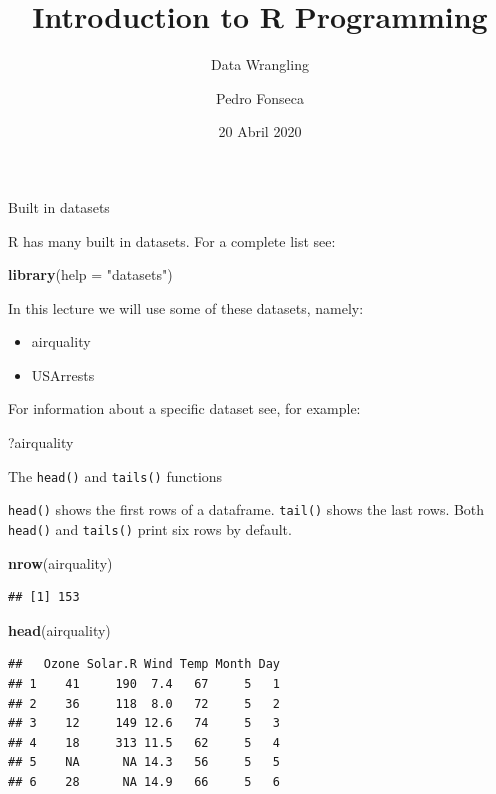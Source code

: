 \documentclass[ignorenonframetext,]{beamer}
\title{Introduction to R Programming}
\subtitle{Data Wrangling}
\author{Pedro Fonseca}
\date{20 Abril 2020}
\newenvironment{Shaded}{\begin{snugshade}}{\end{snugshade}}
\newcommand{\DataTypeTok}[1]{\textcolor[rgb]{0.13,0.29,0.53}{#1}}
\newcommand{\KeywordTok}[1]{\textcolor[rgb]{0.13,0.29,0.53}{\textbf{#1}}}
\newcommand{\NormalTok}[1]{#1}
\newcommand{\StringTok}[1]{\textcolor[rgb]{0.31,0.60,0.02}{#1}}
\providecommand{\tightlist}{%
  \setlength{\itemsep}{0pt}\setlength{\parskip}{0pt}}
\begin{document}
\frame{\titlepage}

\begin{frame}[fragile]{Built in datasets}
\protect\hypertarget{built-in-datasets}{}

R has many built in datasets. For a complete list see:

\begin{Shaded}
\begin{Highlighting}[]
\KeywordTok{library}\NormalTok{(}\DataTypeTok{help =} \StringTok{"datasets"}\NormalTok{)}
\end{Highlighting}
\end{Shaded}

In this lecture we will use some of these datasets, namely:

\begin{itemize}
\tightlist
\item
  airquality
\item
  USArrests
\end{itemize}

For information about a specific dataset see, for example:

\begin{Shaded}
\begin{Highlighting}[]
\NormalTok{?airquality}
\end{Highlighting}
\end{Shaded}

\end{frame}

\begin{frame}[fragile]{The \texttt{head()} and \texttt{tails()}
functions}
\protect\hypertarget{the-head-and-tails-functions}{}

\texttt{head()} shows the first rows of a dataframe. \texttt{tail()}
shows the last rows. Both \texttt{head()} and \texttt{tails()} print six
rows by default.

\begin{Shaded}
\begin{Highlighting}[]
\KeywordTok{nrow}\NormalTok{(airquality)}
\end{Highlighting}
\end{Shaded}

\begin{verbatim}
## [1] 153
\end{verbatim}

\begin{Shaded}
\begin{Highlighting}[]
\KeywordTok{head}\NormalTok{(airquality)}
\end{Highlighting}
\end{Shaded}

\begin{verbatim}
##   Ozone Solar.R Wind Temp Month Day
## 1    41     190  7.4   67     5   1
## 2    36     118  8.0   72     5   2
## 3    12     149 12.6   74     5   3
## 4    18     313 11.5   62     5   4
## 5    NA      NA 14.3   56     5   5
## 6    28      NA 14.9   66     5   6
\end{verbatim}

\end{frame}
\end{document}
